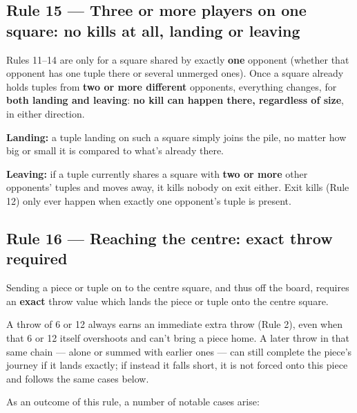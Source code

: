 \documentclass[10pt,a4paper]{article}
\newcommand{\ruletitle}[2]{\subsection*{Rule #1 --- #2}}
\begin{document}
\begin{center}
  
\end{center}

\ruletitle{15}{Three or more players on one square: no kills at all, landing or leaving}

Rules 11--14 are only for a square shared by exactly \textbf{one}
opponent (whether that opponent has one tuple there or several unmerged
ones). Once a square already holds tuples from \textbf{two or more
different} opponents, everything changes, for \textbf{both landing and
leaving}: \textbf{no kill can happen there, regardless of size}, in either
direction.

\textbf{Landing:} a tuple landing on such a square simply joins the pile, no
matter how big or small it is compared to what's already there.

\begin{center}
  
\end{center}

\textbf{Leaving:} if a tuple currently shares a square with \textbf{two or
more} other opponents' tuples and moves away, it kills nobody on exit
either. Exit kills (Rule 12) only ever happen when exactly one opponent's
tuple is present.

\ruletitle{16}{Reaching the centre: exact throw required}

Sending a piece or tuple on to the centre square, and thus off the board,
requires an \textbf{exact} throw value which lands the piece or tuple onto
the centre square.

A throw of 6 or 12 always earns an immediate extra throw (Rule 2), even
when that 6 or 12 itself overshoots and can't bring a piece home. A later
throw in that same chain --- alone or summed with earlier ones --- can
still complete the piece's journey if it lands exactly; if instead it falls
short, it is not forced onto this piece and follows the same cases below.

As an outcome of this rule, a number of notable cases arise:
\end{document}
